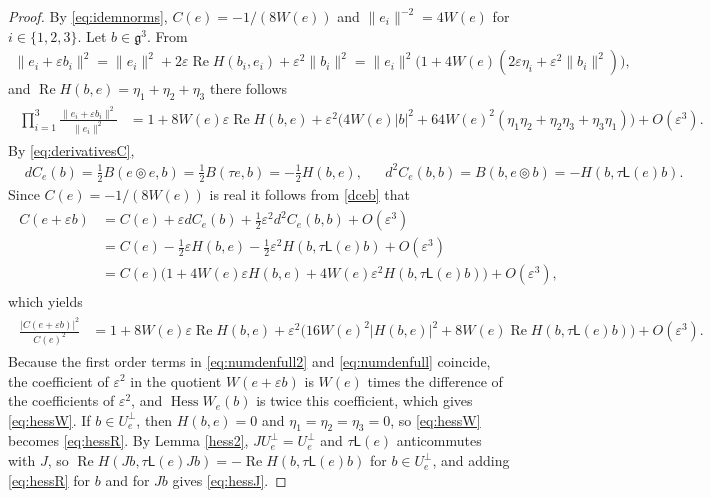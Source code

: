 \documentclass[leqno,10pt]{amsart}
\theoremstyle{definition}
\numberwithin{equation}{section}
\newcommand{\tmlt}{\circledcirc}
\newcommand{\hess}{\operatorname{Hess}}
\newcommand{\lin}{\mathsf{L}}
\newcommand{\re}{\operatorname{Re}}
\newcommand{\g}{\mathfrak{g}}
\newcommand{\norm}[1]{\lVert #1\rVert}
\newcommand{\nnorm}[1]{\lvert #1\rvert}%
\newcommand{\Usp}{U}
\newcommand{\Uperp}{\Usp^{\perp}}
\begin{document}
\begin{proof}
By \eqref{eq:idemnorms}, $C(e) = -1/(8W(e))$ and $\norm{e_{i}}^{-2} = 4W(e)$ for $i \in \{1, 2, 3\}$. Let $b \in \g^{3}$. From
\begin{align}
\norm{e_{i} + \varepsilon b_{i}}^{2} = \norm{e_{i}}^{2} + 2\varepsilon\re H(b_{i}, e_{i}) + \varepsilon^{2}\norm{b_{i}}^{2} = \norm{e_{i}}^{2}\big(1 + 4W(e)(2\varepsilon\eta_{i} + \varepsilon^{2}\norm{b_{i}}^{2})\big), 
\end{align}
and $\re H(b, e) = \eta_{1} + \eta_{2} + \eta_{3}$ there follows
\begin{align}\label{eq:numdenfull2}
\begin{aligned}
\prod_{i=1}^{3}\frac{\norm{e_{i} + \varepsilon b_{i}}^{2}}{\norm{e_{i}}^{2}} &= 1 + 8W(e)\varepsilon\re H(b, e) + \varepsilon^{2}\Big(4W(e)\nnorm{b}^{2} + 64W(e)^{2}(\eta_{1}\eta_{2} + \eta_{2}\eta_{3} + \eta_{3}\eta_{1})\Big) + O(\varepsilon^{3}).
\end{aligned}
\end{align}
By \eqref{eq:derivativesC}, 
\begin{align}\label{dceb}
&dC_{e}(b) = \tfrac{1}{2}B(e\tmlt e, b) = \tfrac{1}{2}B(\tau e, b) = -\tfrac{1}{2}H(b, e), &&d^{2}C_{e}(b, b) = B(b, e\tmlt b) = -H(b, \tau\lin(e)b). 
\end{align}
Since $C(e)= -1/(8W(e))$ is real it follows from \eqref{dceb} that 
\begin{align}
\begin{aligned}
C(e + \varepsilon b) &=C(e) +\varepsilon dC_{e}(b) + \tfrac{1}{2}\varepsilon^{2}d^{2}C_{e}(b, b) + O(\varepsilon^{3})\\
& = C(e) - \tfrac{1}{2}\varepsilon H(b, e) - \tfrac{1}{2}\varepsilon^{2}H(b, \tau\lin(e)b) + O(\varepsilon^{3})\\
&= C(e)\big(1 + 4W(e)\varepsilon H(b, e) + 4W(e)\varepsilon^{2}H(b, \tau\lin(e)b)\big) + O(\varepsilon^{3}),
\end{aligned}
\end{align}
which yields
\begin{align}\label{eq:numdenfull}
\begin{aligned}
\frac{|C(e + \varepsilon b)|^{2}}{C(e)^{2}} &= 1 + 8W(e)\varepsilon\re H(b, e) + \varepsilon^{2}\Big(16W(e)^{2}|H(b, e)|^{2} + 8W(e)\re H(b, \tau\lin(e)b)\Big) + O(\varepsilon^{3}).
\end{aligned}
\end{align}
Because the first order terms in \eqref{eq:numdenfull2} and \eqref{eq:numdenfull} coincide, the coefficient of $\varepsilon^{2}$ in the quotient $W(e + \varepsilon b)$ is $W(e)$ times the difference of the coefficients of $\varepsilon^{2}$, and $\hess W_{e}(b)$ is twice this coefficient, which gives \eqref{eq:hessW}. If $b \in \Uperp_{e}$, then $H(b, e) = 0$ and $\eta_{1} = \eta_{2} = \eta_{3} = 0$, so \eqref{eq:hessW} becomes \eqref{eq:hessR}. By Lemma \ref{hess2}, $J\Uperp_{e} = \Uperp_{e}$ and $\tau\lin(e)$ anticommutes with $J$, so $\re H(Jb, \tau\lin(e)Jb) = -\re H(b, \tau\lin(e)b)$ for $b \in \Uperp_{e}$, and adding \eqref{eq:hessR} for $b$ and for $Jb$ gives \eqref{eq:hessJ}.


\end{proof}
\end{document}
